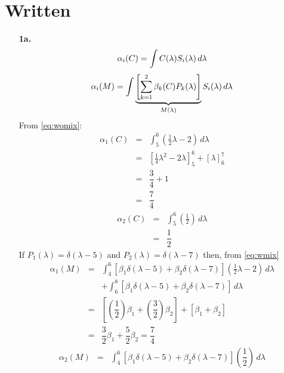\documentclass[10pt, a4paper]{article}
\begin{document}

\section{Written}
\begin{enumerate}
  \item[\textbf{1a. }]
    \begin{equation} \label{eq:womix}
      \alpha_i(C) = \int C(\lambda) S_{i}(\lambda)\, d\lambda \\
    \end{equation}
    \begin{equation} \label{eq:wmix}
      \alpha_i(M) = \int \underbrace{\left[\sum_{k=1}^{2}\beta_{k}(C)P_{k}(\lambda) \right]}_{M(\lambda)}S_i(\lambda)\, d\lambda \\
    \end{equation}
    From \eqref{eq:womix}:
    \begin{eqnarray}
      \alpha_1(C) &=& \int^{6}_{5} \left( \frac{1}{2}\lambda -2 \right) \, d\lambda \\
      &=& \left[\frac{1}{4}\lambda^{2} - 2\lambda \right]^{6}_{5} + \left[\lambda \right]^{7}_{6} \\
      &=& \dfrac{3}{4} + 1 \\
      &=& \dfrac{7}{4}
    \end{eqnarray}
    \begin{eqnarray}
      \alpha_2(C) &=& \int^6_5 \left(\frac{1}{2}\right) \, d\lambda \\
      &=& \dfrac{1}{2}
    \end{eqnarray}
    If
    $P_1(\lambda) = \delta (\lambda-5)$
    and
    $P_2(\lambda) = \delta (\lambda-7)$
    then, from \eqref{eq:wmix}
    \begin{eqnarray}
      \alpha_1(M) &=& \int^6_4 \left[\beta_1\delta(\lambda-5) + \beta_2\delta(\lambda-7)\right]\left(\frac{1}{2}\lambda-2\right)\,
      d\lambda \\
      && + \int^8_6\left[\beta_1\delta(\lambda-5) + \beta_2\delta(\lambda-7)\right]\,d\lambda \nonumber \\
      &=& \left[\left(\dfrac{1}{2}\right)\beta_1 + \left(\dfrac{3}{2}\right)\beta_2\right] + \left[\beta_1 + \beta_2 \right] \\
      &=& \dfrac{3}{2}\beta_1 + \dfrac{5}{2}\beta_2 = \dfrac{7}{4}
    \end{eqnarray}
    \begin{eqnarray}
      \alpha_2(M) &=& \int^6_4\left[\beta_1\delta(\lambda-5) + \beta_2\delta(\lambda-7)\right]\left(\dfrac{1}{2}\right)\,d\lambda \\

\end{eqnarray}
\end{enumerate}
\end{document}

